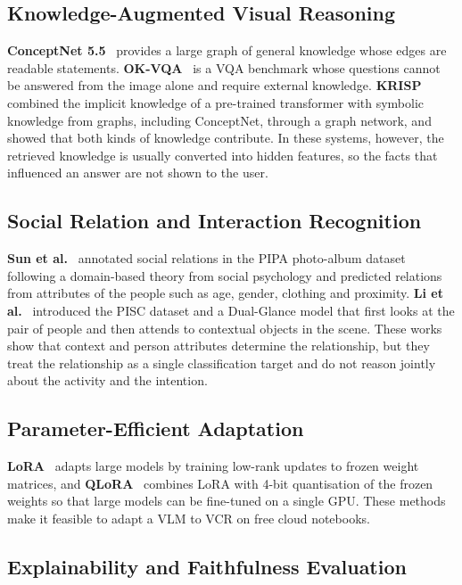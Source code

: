 \documentclass[12pt,a4paper,oneside]{report}
\begin{document}
\subsection{Knowledge-Augmented Visual Reasoning}

\textbf{ConceptNet 5.5}~\cite{speer2017conceptnet} provides a large graph of
general knowledge whose edges are readable statements.
\textbf{OK-VQA}~\cite{marino2019okvqa} is a VQA benchmark whose questions cannot
be answered from the image alone and require external knowledge.
\textbf{KRISP}~\cite{marino2021krisp} combined the implicit knowledge of a
pre-trained transformer with symbolic knowledge from graphs, including
ConceptNet, through a graph network, and showed that both kinds of knowledge
contribute. In these systems, however, the retrieved knowledge is usually
converted into hidden features, so the facts that influenced an answer are not
shown to the user.

\subsection{Social Relation and Interaction Recognition}

\textbf{Sun et al.}~\cite{sun2017domain} annotated social relations in the PIPA
photo-album dataset following a domain-based theory from social psychology and
predicted relations from attributes of the people such as age, gender, clothing
and proximity. \textbf{Li et al.}~\cite{li2017dualglance} introduced the PISC
dataset and a Dual-Glance model that first looks at the pair of people and then
attends to contextual objects in the scene. These works show that context and
person attributes determine the relationship, but they treat the relationship
as a single classification target and do not reason jointly about the activity
and the intention.

\subsection{Parameter-Efficient Adaptation}

\textbf{LoRA}~\cite{hu2022lora} adapts large models by training low-rank updates
to frozen weight matrices, and \textbf{QLoRA}~\cite{dettmers2023qlora} combines
LoRA with 4-bit quantisation of the frozen weights so that large models can be
fine-tuned on a single GPU. These methods make it feasible to adapt a VLM to VCR
on free cloud notebooks.

\subsection{Explainability and Faithfulness Evaluation}
\end{document}

